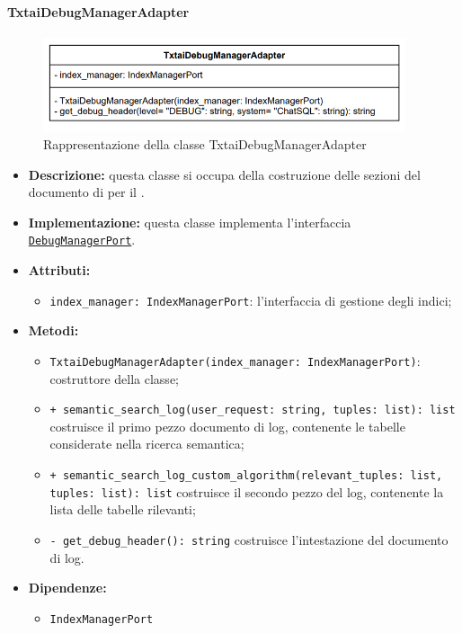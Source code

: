\paragraph{TxtaiDebugManagerAdapter} \label{TxtaiDebugManagerAdapter}
\begin{figure}[H]
    \centering
    \includegraphics[width=0.95\textwidth]{assets/Backend/txtai_debug_manager_adapter.png}
    \caption{Rappresentazione della classe TxtaiDebugManagerAdapter}
  \end{figure}
\begin{itemize}
    \item \textbf{Descrizione:} questa classe si occupa della costruzione delle sezioni del documento di  per il .
    \item \textbf{Implementazione:} questa classe implementa l'interfaccia \hyperref[DebugManagerPort]{\texttt{DebugManagerPort}}.
    \item \textbf{Attributi:}
    \begin{itemize}
        \item \texttt{index\_manager: IndexManagerPort}: l'interfaccia di gestione degli indici;
    \end{itemize}
    \item \textbf{Metodi:}
    \begin{itemize}
        \item \texttt{TxtaiDebugManagerAdapter(index\_manager: IndexManagerPort)}: costruttore della classe;
        \item \texttt{+ semantic\_search\_log(user\_request: string, tuples: list): list} costruisce il primo pezzo documento di log, contenente le tabelle considerate nella ricerca semantica;
        \item \texttt{+ semantic\_search\_log\_custom\_algorithm(relevant\_tuples: list, tuples: list): list} costruisce il secondo pezzo del log, contenente la lista delle tabelle rilevanti;
        \item \texttt{- get\_debug\_header(): string} costruisce l'intestazione del documento di log.
    \end{itemize}
    \item \textbf{Dipendenze:}
    \begin{itemize}
        \item \texttt{IndexManagerPort}
    \end{itemize}
\end{itemize} 

